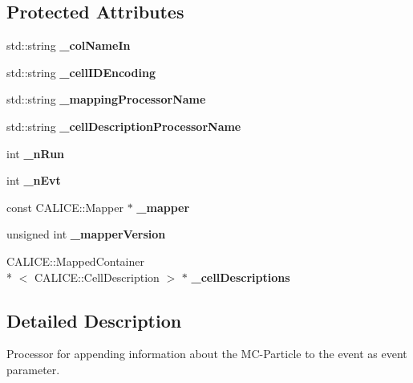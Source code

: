 \subsection*{Protected Attributes}
\begin{DoxyCompactItemize}
\item 
std\-::string {\bfseries \-\_\-col\-Name\-In}\label{classCALICE_1_1AppendMCParticleInformation_a7166f2cbd6aeccb317131f1b6578f945}

\item 
std\-::string {\bfseries \-\_\-cell\-I\-D\-Encoding}\label{classCALICE_1_1AppendMCParticleInformation_a6bb63d9cf269d9a4211a76ceff5fd32e}

\item 
std\-::string {\bfseries \-\_\-mapping\-Processor\-Name}\label{classCALICE_1_1AppendMCParticleInformation_ad1b80810b8e0de330676044e0c6e4fd6}

\item 
std\-::string {\bfseries \-\_\-cell\-Description\-Processor\-Name}\label{classCALICE_1_1AppendMCParticleInformation_a94201a45224b1c6817cefcae24f58d12}

\item 
int {\bfseries \-\_\-n\-Run}\label{classCALICE_1_1AppendMCParticleInformation_a261e3260ab61279cbc74c61c7103c098}

\item 
int {\bfseries \-\_\-n\-Evt}\label{classCALICE_1_1AppendMCParticleInformation_a94b6171871d2e0f4d1833c89b7a54d93}

\item 
const C\-A\-L\-I\-C\-E\-::\-Mapper $\ast$ {\bfseries \-\_\-mapper}\label{classCALICE_1_1AppendMCParticleInformation_af50d0e10a2da2aed02d51b4bc19817c5}

\item 
unsigned int {\bfseries \-\_\-mapper\-Version}\label{classCALICE_1_1AppendMCParticleInformation_a9b5d220515549d9b7989e9c7fd7d74c1}

\item 
C\-A\-L\-I\-C\-E\-::\-Mapped\-Container\\*
$<$ C\-A\-L\-I\-C\-E\-::\-Cell\-Description $>$ $\ast$ {\bfseries \-\_\-cell\-Descriptions}\label{classCALICE_1_1AppendMCParticleInformation_ae56390007bed950d4bb042c41dcf258e}

\end{DoxyCompactItemize}


\subsection{Detailed Description}
Processor for appending information about the M\-C-\/\-Particle to the event as event parameter. 

